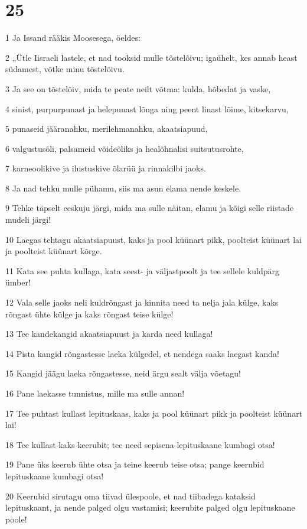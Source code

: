 \chapter{25}

\par 1 Ja Issand rääkis Moosesega, öeldes:
\par 2 „Ütle Iisraeli lastele, et nad tooksid mulle tõstelõivu; igaühelt, kes annab heast südamest, võtke minu tõstelõivu.
\par 3 Ja see on tõstelõiv, mida te peate neilt võtma: kulda, hõbedat ja vaske,
\par 4 sinist, purpurpunast ja helepunast lõnga ning peent linast lõime, kitsekarvu,
\par 5 punaseid jääranahku, merilehmanahku, akaatsiapuud,
\par 6 valgustusõli, palsameid võideõliks ja healõhnalisi suitsutusrohte,
\par 7 karneoolikive ja ilustuskive õlarüü ja rinnakilbi jaoks.
\par 8 Ja nad tehku mulle pühamu, siis ma asun elama nende keskele.
\par 9 Tehke täpselt eeskuju järgi, mida ma sulle näitan, elamu ja kõigi selle riistade mudeli järgi!
\par 10 Laegas tehtagu akaatsiapuust, kaks ja pool küünart pikk, poolteist küünart lai ja poolteist küünart kõrge.
\par 11 Kata see puhta kullaga, kata seest- ja väljastpoolt ja tee sellele kuldpärg ümber!
\par 12 Vala selle jaoks neli kuldrõngast ja kinnita need ta nelja jala külge, kaks rõngast ühte külge ja kaks rõngast teise külge!
\par 13 Tee kandekangid akaatsiapuust ja karda need kullaga!
\par 14 Pista kangid rõngastesse laeka külgedel, et nendega saaks laegast kanda!
\par 15 Kangid jäägu laeka rõngastesse, neid ärgu sealt välja võetagu!
\par 16 Pane laekasse tunnistus, mille ma sulle annan!
\par 17 Tee puhtast kullast lepituskaas, kaks ja pool küünart pikk ja poolteist küünart lai!
\par 18 Tee kullast kaks keerubit; tee need sepisena lepituskaane kumbagi otsa!
\par 19 Pane üks keerub ühte otsa ja teine keerub teise otsa; pange keerubid lepituskaane kumbagi otsa!
\par 20 Keerubid sirutagu oma tiivad ülespoole, et nad tiibadega kataksid lepituskaant, ja nende palged olgu vastamisi; keerubite palged olgu lepituskaane poole!
